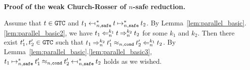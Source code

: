 \noindent\textbf{Proof of the weak Church-Rosser of $n$-safe reduction.}

Assume that $t\in {\tt GTC}$ and $t_1 \nsafeReducesAstL{n} t \nsafeReducesAst{n} t_2$. 
By Lemma~\ref{lem:parallel_basic}.\ref{lem:parallel_basic2},
we have $t_1 \mathbin{\Leftarrow_{n}^{k_1}} t \mathbin{\Rightarrow_{n}^{k_2}} t_2$ for some $k_1$ and $k_2$.
Then there exist $t_1', t_2' \in {\tt GTC}$ such that
$t_1 \mathbin{\Rightarrow_{n}^{k_2}} t_1' \mathbin{\approx_{n,{\tt cond}}} t_2' \mathbin{\Leftarrow_{n}^{k_1}} t_2$.
By Lemma~\ref{lem:parallel_basic}.\ref{lem:parallel_basic3},
$t_1 \nsafeReducesAst{n} t'_1 \nequal{n,\cond} t'_2 \nsafeReducesAstL{n} t_2$ holds as we wished.


